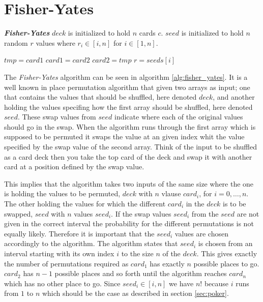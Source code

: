 \documentclass[twoside,11pt,openright]{report}
\newcommand{\FY}{\textit{Fisher-Yates} }
\begin{document}
\section{Fisher-Yates}
\label{sec:fisher-yates}
\begin{algorithm}
\caption{\textbf{\textit{Fisher-Yates}} \newline
    $deck$ is initialized to hold $n$ cards $c$. \newline
    $seed$ is initialized to hold $n$ random $r$ values where $r_i\in[i,n]$ for $i\in [1,n]$.
}
\label{alg:fisher_yates}

\begin{algorithmic}[1]
\State $tmp = card1$
\State $card1 = card2$
\State $card2 = tmp$
\EndFunction
\State
{}
\State $r = seeds[i]$
\State {}
\EndFor
\EndFunction
\end{algorithmic}
\end{algorithm}

The \FY algorithm can be seen in algorithm \ref{alg:fisher_yates}. It is a well known in place permutation algorithm that given two arrays as input; one that contains the values that should be shuffled, here denoted $deck$, and another holding the values specifing how the first array should be shuffled, here denoted $seed$. These swap values from $seed$ indicate where each of the original values should go in the swap. When the algorithm runs through the first array which is supposed to be permuted it swaps the value at an given index whit the value specified by the swap value of the second array. Think of the input to be shuffled as a card deck then you take the top card of the deck and swap it with another card at a position defined by the swap value.

This implies that the algorithm takes two inputs of the same size where the one is holding the values to be permuted, $deck$ with $n$ vlause $card_i$, for $i=0,\dots,n$. The other holding the values for which the different $card_i$ in the $deck$ is to be swapped, $seed$ with $n$ values $seed_i$. If the swap values $seed_i$ from the $seed$ are not given in the correct interval the probability for the different permutations is not equally likely. Therefore it is important that the $seed_i$ values are chosen accordingly to the algorithm. The algorithm states that $seed_i$ is chosen from an interval starting with its own index $i$ to the size $n$ of the $deck$. This gives exactly the number of permutations required as $card_1$ has exactly $n$ possible places to go. $card_2$ has $n-1$ possible places and so forth until the algorithm reaches $card_n$ which has no other place to go. Since $seed_i\in[i,n]$ we have $n!$ because $i$ runs from $1$ to $n$ which should be the case as described in section \ref{sec:poker}.
\end{document}

